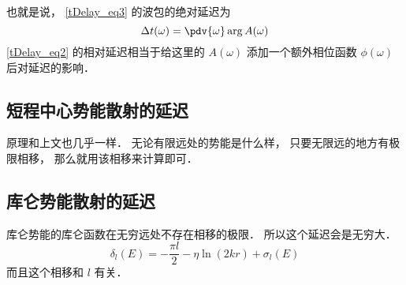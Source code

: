 也就是说， \autoref{tDelay_eq3} 的波包的绝对延迟为
\begin{equation}\label{tDelay_eq4}
\Delta t(\omega) = \pdv{\omega}\arg A(\omega)
\end{equation}
\autoref{tDelay_eq2} 的相对延迟相当于给这里的 $A(\omega)$ 添加一个额外相位函数 $\phi(\omega)$ 后对延迟的影响．

\subsection{短程中心势能散射的延迟}

原理和上文也几乎一样． 无论有限远处的势能是什么样， 只要无限远的地方有极限相移， 那么就用该相移来计算即可．

\subsection{库仑势能散射的延迟}
库仑势能的库仑函数在无穷远处不存在相移的极限． 所以这个延迟会是无穷大．
\begin{equation}
\delta_l(E) =  - \frac{\pi l}{2} - \eta\ln(2kr) + \sigma_l(E)
\end{equation}
而且这个相移和 $l$ 有关．
